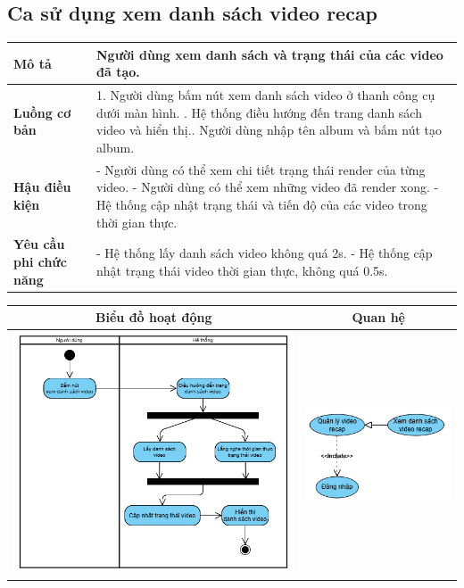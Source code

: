\subsection{Ca sử dụng xem danh sách video recap}

\vspace{0.5cm}

\noindent 
\begin{tabularx}{\linewidth}{| l | X |} 
\hline 
\textbf{Mô tả} & Người dùng xem danh sách và trạng thái của các video đã tạo. \\
\hline 
\textbf{Luồng cơ bản} & 1. Người dùng bấm nút xem danh sách video ở thanh công cụ dưới màn hình. \newline
                       2. Hệ thống điều hướng đến trang danh sách video và hiển thị.\newline
                       3. Người dùng nhập tên album và bấm nút tạo album. \\
\hline 
\textbf{Hậu điều kiện} & - Người dùng có thể xem chi tiết trạng thái render của từng video. \newline
                        - Người dùng có thể xem những video đã render xong. \newline
                        - Hệ thống cập nhật trạng thái và tiến độ của các video trong thời gian thực. \\
\hline 
\textbf{Yêu cầu phi chức năng} & - Hệ thống lấy danh sách video không quá 2s. \newline
                        - Hệ thống cập nhật trạng thái video thời gian thực, không quá 0.5s. \\   
\hline 
\end{tabularx}

\vspace{0.8cm}

\noindent 
\begin{tabular}{| c | c |}
    \hline
    \textbf{Biểu đồ hoạt động} & \textbf{Quan hệ} \\ 
    \hline
    \includegraphics[width=0.6\linewidth]{figures/c3/3-3-8-activity-diagram.png} 
    &  
    \includegraphics[width=0.35\linewidth]{figures/c3/3-3-8-relationship.png} \\ 
    \hline
\end{tabular}

